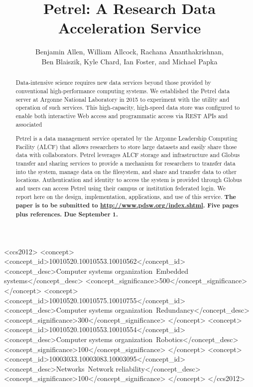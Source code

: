 \documentclass[sigconf]{acmart}
\begin{document}
\title{Petrel: A Research Data Acceleration Service}

\author{Benjamin Allen, William Allcock, Rachana Ananthakrishnan,\\Ben Blaiszik, Kyle Chard, Ian Foster, and Michael Papka}
\renewcommand{\shortauthors}{B. Allen et al.}


\begin{abstract}

Data-intensive science requires new data services beyond those provided by conventional
high-performance computing systems.
We established the Petrel data server at Argonne National Laboratory in 2015 to experiment with the utility and operation of such services.
This high-capacity, high-speed data store was configured to enable both interactive Web access
and programmatic access via REST APIs and associated 


Petrel is a data management service operated by the Argonne Leadership Computing Facility (ALCF)
that allows researchers to store large datasets and easily share those data with collaborators. 
Petrel leverages ALCF
storage and infrastructure and Globus transfer and sharing services to provide a mechanism for researchers to transfer data into the system, manage data on the filesystem, and share and transfer data to other locations. Authentication and identity to access the system is provided through Globus and users can access Petrel using their campus or institution federated login.
We report here on the design, implementation, applications, and use of this service.
\textbf{The paper is to be submitted to \url{http://www.pdsw.org/index.shtml}. Five pages plus references. Due September 1.}
\end{abstract}

%
%
\begin{CCSXML}
<ccs2012>
 <concept>
  <concept_id>10010520.10010553.10010562</concept_id>
  <concept_desc>Computer systems organization~Embedded systems</concept_desc>
  <concept_significance>500</concept_significance>
 </concept>
 <concept>
  <concept_id>10010520.10010575.10010755</concept_id>
  <concept_desc>Computer systems organization~Redundancy</concept_desc>
  <concept_significance>300</concept_significance>
 </concept>
 <concept>
  <concept_id>10010520.10010553.10010554</concept_id>
  <concept_desc>Computer systems organization~Robotics</concept_desc>
  <concept_significance>100</concept_significance>
 </concept>
 <concept>
  <concept_id>10003033.10003083.10003095</concept_id>
  <concept_desc>Networks~Network reliability</concept_desc>
  <concept_significance>100</concept_significance>
 </concept>
</ccs2012>  
\end{CCSXML}
\end{document}
